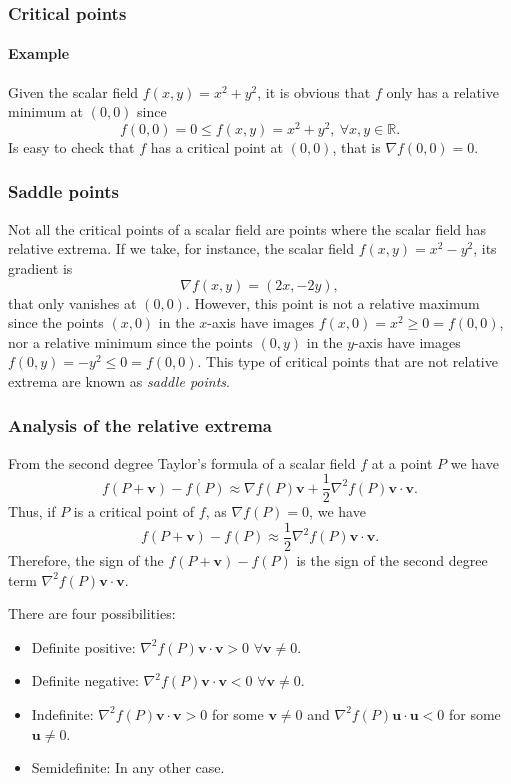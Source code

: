 \begin{frame}
\frametitle{Critical points}
\framesubtitle{Example}
Given the scalar field $f(x,y)=x^2+y^2$, it is obvious that $f$ only has a relative minimum at $(0,0)$ since
\[
f(0,0)=0 \leq f(x,y)=x^2+y^2,\ \forall x,y\in \mathbb{R}.
\]
Is easy to check that $f$ has a critical point at $(0,0)$, that is $\nabla f(0,0) = 0$.
\begin{center}

\end{center}
\end{frame}


\begin{frame}
\frametitle{Saddle points}
Not all the critical points of a scalar field are points where the scalar field has relative extrema. 
If we take, for instance, the scalar field $f(x,y)=x^2-y^2$, its gradient is 
\[
\nabla f(x,y) = (2x,-2y),
\]
that only vanishes at $(0,0)$.
However, this point is not a relative maximum since the points $(x,0)$ in the $x$-axis have images $f(x,0)=x^2\geq
0=f(0,0)$, nor a relative minimum since the points $(0,y)$ in the $y$-axis have images $f(0,y)=-y^2\leq
0=f(0,0)$. 
This type of critical points that are not relative extrema are known as \emph{saddle points}.
\begin{center}

\end{center}
\end{frame}


\begin{frame}
\frametitle{Analysis of the relative extrema}
From the second degree Taylor's formula of a scalar field $f$ at a point $P$ we have 
\[
f(P+\mathbf{v})-f(P)\approx \nabla f(P)\mathbf{v}+\frac{1}{2}\nabla^2f(P)\mathbf{v}\cdot\mathbf{v}.
\]
Thus, if $P$ is a critical point of $f$, as $\nabla f(P)=0$, we have
\[
f(P+\mathbf{v})-f(P)\approx \frac{1}{2}\nabla^2f(P)\mathbf{v}\cdot\mathbf{v}.
\]
Therefore, the sign of the $f(P+\mathbf{v})-f(P)$ is the sign of the second degree term $\nabla^2f(P)\mathbf{v}\cdot\mathbf{v}$.

There are four possibilities:
\begin{itemize}
\item Definite positive: $\nabla^2f(P)\mathbf{v}\cdot\mathbf{v}>0$ $\forall \mathbf{v}\neq 0$.
\item Definite negative: $\nabla^2f(P)\mathbf{v}\cdot\mathbf{v}<0$ $\forall \mathbf{v}\neq 0$.
\item Indefinite: $\nabla^2f(P)\mathbf{v}\cdot\mathbf{v}>0$ for some $\mathbf{v}\neq 0$ and $\nabla^2f(P)\mathbf{u}\cdot\mathbf{u}<0$ for some $\mathbf{u}\neq 0$.
\item Semidefinite: In any other case. 
\end{itemize}
\end{frame}


